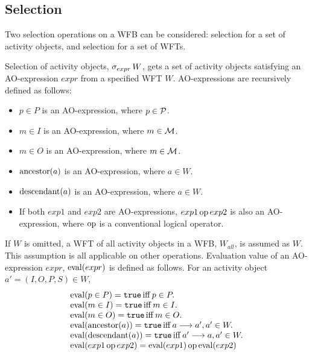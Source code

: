 \subsection{Selection}

Two selection operations on a WFB can be considered: selection for a set 
of activity objects, and selection for a set of WFTs.

Selection of activity objects, $\mathop{\sigma}_{expr} W$, gets a set of activity
objects satisfying an AO-expression $expr$ from a specified WFT $W$.
AO-expressions are recursively defined as follows:
\begin{itemize}
 \itemsep0mm\parskip0mm
 \item $p \in P$ is an AO-expression, where $p \in {\cal P}$.
 \item $m \in I$ is an AO-expression, where $m \in {\cal M}$.
 \item $m \in O$ is an AO-expression, where $m \in {\cal M}$.
 \item $\mathop{\rm ancestor}\nolimits(a)$ is an AO-expression, where $a \in W$.
 \item $\mathop{\rm descendant}\nolimits(a)$ is an AO-expression, where $a \in W$.
 \item If both $exp1$ and $exp2$ are AO-expressions, $exp1 \mathop{\rm op}\nolimits
      exp2$ is also an AO-expression, where $\mathop{\rm op}\nolimits$ is a conventional logical
      operator.
\end{itemize}
If $W$ is omitted, a WFT of all activity objects in a WFB, $W_{all}$, is
assumed as $W$.  This assumption is all applicable on other operations.
Evaluation value of an AO-expression $expr$, $\mathop{\rm eval}\nolimits(expr)$ is defined as
follows.  For an activity object $a' = (I, O, P, S) \in W$,
\[
 \begin{array}{l}
 \mathop{\rm eval}\nolimits(p \in P) = {\tt true} \mathop{\rm iff}\nolimits p \in P.\\
 \mathop{\rm eval}\nolimits(m \in I) = {\tt true} \mathop{\rm iff}\nolimits m \in I.\\
 \mathop{\rm eval}\nolimits(m \in O) = {\tt true} \mathop{\rm iff}\nolimits m \in O.\\
 \mathop{\rm eval}\nolimits(\mathop{\rm ancestor}\nolimits(a)) = {\tt true} \mathop{\rm iff}\nolimits a \longrightarrow a', a' \in W.\\
 \mathop{\rm eval}\nolimits(\mathop{\rm descendant}\nolimits(a)) = {\tt true} \mathop{\rm iff}\nolimits a' \longrightarrow a, a' \in W.\\
 \mathop{\rm eval}\nolimits(exp1 \mathop{\rm op}\nolimits exp2) = \mathop{\rm eval}\nolimits(exp1) \mathop{\rm op}\nolimits \mathop{\rm eval}\nolimits(exp2)
 \end{array}
\]

